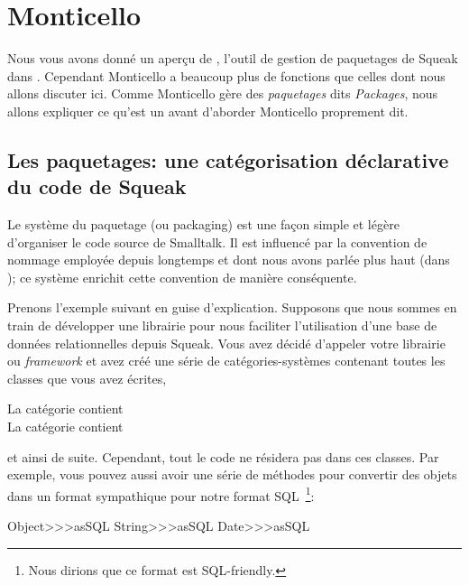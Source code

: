 \documentclass[a4paper,10pt,twoside]{book}
\begin{document}
\section{Monticello}

Nous vous avons donn\'e un aper\c{c}u de , l'outil de gestion
de paquetages de Squeak dans .  
Cependant Monticello a beaucoup plus de fonctions que celles dont nous allons
discuter ici.
Comme Monticello g\`ere des \emph{paquetages} dits \emph{Packages}, nous allons expliquer ce qu'est
un  avant d'aborder Monticello proprement dit.

\subsection{Les paquetages: une cat\'egorisation d\'eclarative du code de Squeak}

Le syst\`eme du paquetage (ou packaging) est une fa\c{c}on simple et l\'eg\`ere
d'organiser le code source de Smalltalk.
Il est influenc\'e par la convention de nommage employ\'ee depuis longtemps et dont nous avons parl\'ee plus haut (dans ); ce syst\`eme enrichit cette convention de mani\`ere cons\'equente.

Prenons l'exemple suivant en guise d'explication.
Supposons que nous sommes en train de d\'evelopper une librairie pour
nous faciliter l'utilisation d'une base de donn\'ees relationnelles depuis
Squeak. Vous avez d\'ecid\'e d'appeler votre librairie ou \emph{framework}
 et avez cr\'e\'e une s\'erie de cat\'egories-syst\`emes
contenant toutes les classes que vous avez \'ecrites, \eg

\vspace{1ex}
\noindent
La cat\'egorie  contient \\
La cat\'egorie  contient 

\vspace{1ex}
\noindent
et ainsi de suite. Cependant, tout le code ne r\'esidera pas dans ces classes.
Par exemple, vous pouvez aussi avoir une s\'erie de m\'ethodes pour 
convertir des objets dans un format sympathique pour notre format SQL~\footnote{Nous dirions que ce format est SQL-friendly.}:

\begin{code}{}
Object>>>asSQL
String>>>asSQL
Date>>>asSQL
\end{code}
\end{document}
